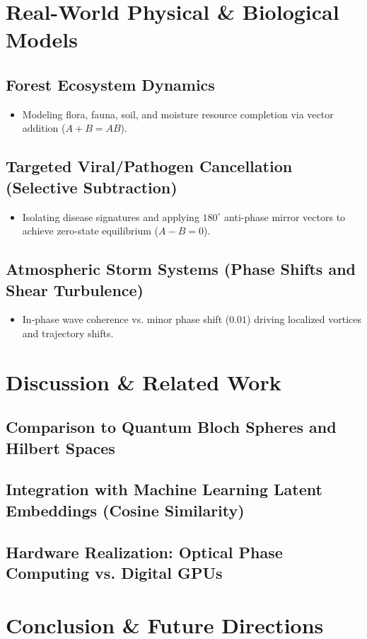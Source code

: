 \documentclass[12pt, a4paper]{article}
\begin{document}
\section{Real-World Physical \& Biological Models}
\subsection{Forest Ecosystem Dynamics}
\begin{itemize}
    \item Modeling flora, fauna, soil, and moisture resource completion via vector addition ($A + B = AB$).
\end{itemize}

\subsection{Targeted Viral/Pathogen Cancellation (Selective Subtraction)}
\begin{itemize}
    \item Isolating disease signatures and applying $180^\circ$ anti-phase mirror vectors to achieve zero-state equilibrium ($A - B = 0$).
\end{itemize}

\subsection{Atmospheric Storm Systems (Phase Shifts and Shear Turbulence)}
\begin{itemize}
    \item In-phase wave coherence vs. minor phase shift ($0.01$) driving localized vortices and trajectory shifts.
\end{itemize}

\section{Discussion \& Related Work}
\subsection{Comparison to Quantum Bloch Spheres and Hilbert Spaces}
\subsection{Integration with Machine Learning Latent Embeddings (Cosine Similarity)}
\subsection{Hardware Realization: Optical Phase Computing vs. Digital GPUs}

\section{Conclusion \& Future Directions}
\end{document}
